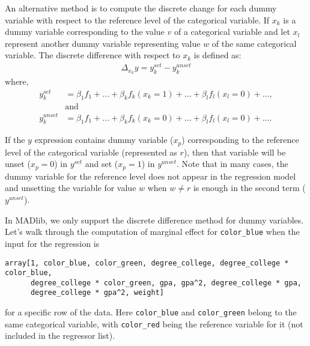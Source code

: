 An alternative method is to compute the discrete change for each dummy variable with
respect to the reference level of the categorical variable. If $x_k$ is a dummy
variable corresponding to the value $v$ of a categorical variable and let $x_l$
represent another dummy variable representing value $w$ of the same categorical
variable. The discrete difference with respect to $x_k$ is defined as:
\begin{align*}
    \Delta_{x_k} y = y_{k}^{set} - y_{k}^{unset}
\end{align*}
where,
\begin{align*}
    y_{k}^{set} &=  \beta_1 f_1 + \ldots + \beta_k f_k(x_k=1) + \ldots + \beta_l f_l(x_l=0) + \ldots, \\
    & \text{and} \\
    y_{k}^{unset} &=  \beta_1 f_1 + \ldots + \beta_k f_k(x_k=0) + \ldots + \beta_l f_l(x_l=0) + \ldots.
\end{align*}

If the $y$ expression contains dummy variable ($x_p$) corresponding to the
reference level of the categorical variable (represented as $r$), then that
variable will be unset ($x_p = 0$) in $y^{set}$ and set ($x_p = 1$) in $y^{unset}$.
Note that in many cases, the dummy variable for the reference level does not
appear in the regression model and unsetting the variable for value $w$
when $w\neq r$ is enough in the second term ($y^{unset}$).

In MADlib, we only support the discrete difference method for dummy
variables. Let's walk through the computation of marginal effect for \verb|color_blue| when
the input for the regression is
\begin{verbatim}
array[1, color_blue, color_green, degree_college, degree_college * color_blue,
      degree_college * color_green, gpa, gpa^2, degree_college * gpa,
      degree_college * gpa^2, weight]
\end{verbatim}
for a specific row of the data. Here \verb|color_blue| and \verb|color_green|
belong to the same categorical variable, with \verb|color_red| being the
reference variable for it (not included in the regressor list).

